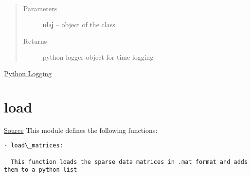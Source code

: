 \documentclass[letterpaper,10pt,english]{sphinxmanual}
\begin{document}

\begin{fulllineitems}
\label{index:brake.initialize.logger.return_time_logger}~\begin{quote}\begin{description}
\item[{Parameters}] \leavevmode
\textbf{obj} -- object of the class 

\item[{Returns}] \leavevmode
{} python logger object for time logging

\end{description}\end{quote}

\end{fulllineitems}





\href{https://docs.python.org/2/library/logging.html}{Python Logging}




\section{load}
\label{index:load}
\href{https://bitbucket.org/akadar/brakesqueal0.1/src/10fdbd0824e88ebbee4f44cefa781c01e586db41/brake/initialize/load.py?at=master}{Source}
\label{index:module-brake.initialize.load}
This module defines the following functions:

\begin{Verbatim}[commandchars=\\\{\}]
- load\_matrices:

  This function loads the sparse data matrices in .mat format and adds them to a python list
\end{Verbatim}
\end{document}
